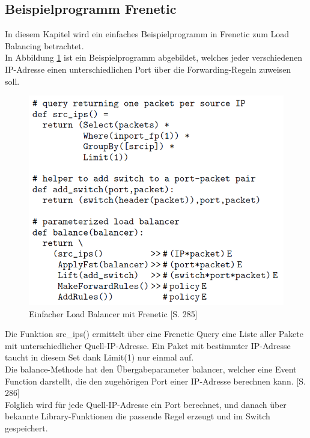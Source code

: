 \documentclass[10pt,conference]{IEEEtran}
\begin{document}
\subsection{Beispielprogramm Frenetic}
In diesem Kapitel wird ein einfaches Beispielprogramm in Frenetic zum Load Balancing betrachtet.\\
In Abbildung \ref{fig:freneticSimpleLoadBalancer} ist ein Beispielprogramm abgebildet, welches jeder verschiedenen IP-Adresse einen unterschiedlichen Port über die Forwarding-Regeln zuweisen soll.
\begin{figure}[h]
	\centering
	\includegraphics[width=\columnwidth]{images/freneticSimpleLoadBalancer.PNG}
	\caption{Einfacher Load Balancer mit Frenetic \cite{4}[S. 285]}
	\label{fig:freneticSimpleLoadBalancer}
\end{figure}
Die Funktion src\_ips() ermittelt über eine Frenetic Query eine Liste aller Pakete mit unterschiedlicher Quell-IP-Adresse. Ein Paket mit bestimmter IP-Adresse taucht in diesem Set dank Limit(1) nur einmal auf.\\
Die balance-Methode hat den Übergabeparameter balancer, welcher eine Event Function darstellt, die den zugehörigen Port einer IP-Adresse berechnen kann. \cite{4}[S. 286]\\
Folglich wird für jede Quell-IP-Adresse ein Port berechnet, und danach über bekannte Library-Funktionen die passende Regel erzeugt und im Switch gespeichert.
\end{document}
